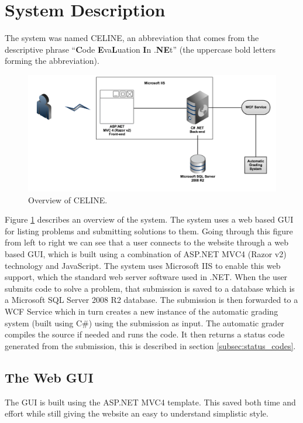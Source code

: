 \section{System Description}
The system was named CELINE, an abbreviation that comes from the descriptive phrase ``\textbf{C}ode \textbf{E}va\textbf{L}uation \textbf{I}n .\textbf{NE}t'' (the uppercase bold letters forming the abbreviation).

\begin{figure}[h]
	\centering
	\includegraphics[width=0.9\linewidth]{chapters/media/overview.png}
	\caption{Overview of CELINE.}
	\label{fig:SystemOverview}
\end{figure}

Figure \ref{fig:SystemOverview} describes an overview of the system. The system uses a web based GUI for listing problems and submitting solutions to them. Going through this figure from left to right we can see that a user connects to the website through a web based GUI, which is built using a combination of ASP.NET MVC4 (Razor v2) technology and JavaScript. The system uses Microsoft IIS to enable this web support, which the standard web server software used in .NET. When the user submits code to solve a problem, that submission is saved to a database which is a Microsoft SQL Server 2008 R2 database. The submission is then forwarded to a WCF Service which in turn creates a new instance of the automatic grading system (built using C\#) using the submission as input. The automatic grader compiles the source if needed and runs the code. It then returns a status code generated from the submission, this is described in section \ref{subsec:status_codes}.


\subsection{The Web GUI}
The GUI is built using the ASP.NET MVC4 template. This saved both time and effort while still giving the website an easy to understand simplistic style.

